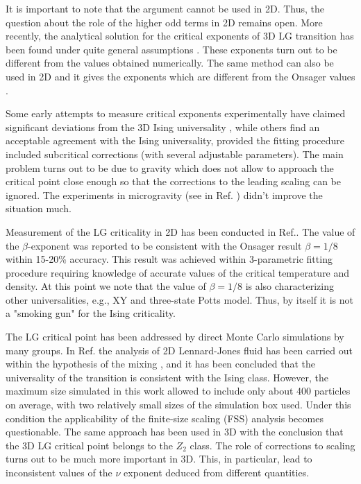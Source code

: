 \documentclass[prb,aps,twocolumn,groupedaddress,floats,showpacs,final]{revtex4}
\begin{document}
It is important to note that the argument \cite{Nicoll} cannot be used in 2D. Thus, the question about the role of the higher odd terms in 2D remains open. More recently, the analytical solution for the critical exponents of 3D LG transition has been found under quite general assumptions \cite{Bondarev}. These exponents turn out to be different from the values obtained numerically. The same method can also be used in 2D and it gives the exponents which are different from the Onsager values \cite{Bondarev_priv}.


 Some early attempts to measure critical exponents experimentally have claimed significant deviations from the 3D Ising universality \cite{Wulkowitz,Garland}, while others \cite{Hayes,Moses} find an acceptable agreement with the Ising universality, provided the fitting procedure included subcritical corrections (with several adjustable parameters). The main problem turns out to be due to gravity which does not allow to approach the critical point close enough so that the corrections to the leading scaling can be ignored.
The  experiments in microgravity (see in Ref. \cite{RMP_2007}) didn't improve the situation much. 

Measurement of the LG criticality in 2D has been conducted in Ref.\cite{Moses_2D}. The value of the $\beta$-exponent was reported to be consistent with the Onsager result $\beta=1/8$ within 15-20\% accuracy. This result was achieved within 3-parametric fitting procedure requiring knowledge of accurate values of the critical temperature and density. At this point we note that the value of $\beta =1/8$ is also characterizing other universalities, e.g.,  XY and three-state Potts model. Thus, by itself it is not a "smoking gun" for the Ising criticality.   


The LG critical point has been addressed by direct Monte Carlo simulations by many groups. In Ref.\cite{Bruce} the analysis of 2D Lennard-Jones fluid has been carried out within the hypothesis of the mixing \cite{Mermin,Pokrovskii,Patashin}, and it has been concluded that the universality of the transition is consistent with the Ising class. However, the maximum size simulated in this work allowed to include only about 400 particles on average, with two relatively small sizes of the simulation box used. Under this condition the applicability of the finite-size scaling (FSS) analysis becomes questionable. The same approach has been used in 3D \cite{Wilding} with the conclusion that the 3D LG critical point belongs to the $Z_2$ class. The role of corrections to scaling turns out to be much more important in 3D. This, in particular, lead to inconsistent values of the $\nu$ exponent deduced from different quantities.       
\end{document}
